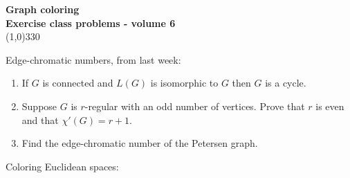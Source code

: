 \documentclass[a4paper]{article}
\begin{document}
\pagestyle{empty}
\begin{center}
	{\Large\bf Graph coloring}\\
	{\large\bf Exercise class problems - volume 6}\\
	\line(1,0){330}
\end{center}

Edge-chromatic numbers, from last week:

\begin{enumerate}
\item If $G$ is connected and $L(G)$ is isomorphic to $G$ then $G$ is a cycle.
\item Suppose $G$ is $r$-regular with an odd number of vertices. Prove that $r$ is even and that $\chi'(G)=r+1$.
\item Find the edge-chromatic number of the Petersen graph.
\end{enumerate}

Coloring Euclidean spaces:
\end{document}
